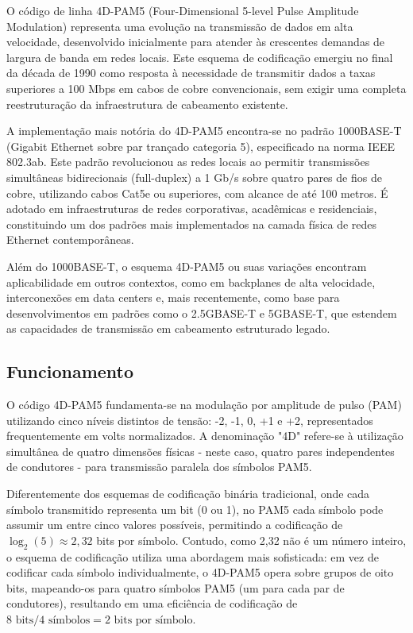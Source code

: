 \documentclass[conference]{IEEEtran}
\begin{document}
O código de linha 4D-PAM5 (Four-Dimensional 5-level Pulse Amplitude Modulation) representa uma evolução na transmissão de dados em alta velocidade, desenvolvido inicialmente para atender às crescentes demandas de largura de banda em redes locais. Este esquema de codificação emergiu no final da década de 1990 como resposta à necessidade de transmitir dados a taxas superiores a 100 Mbps em cabos de cobre convencionais, sem exigir uma completa reestruturação da infraestrutura de cabeamento existente.

A implementação mais notória do 4D-PAM5 encontra-se no padrão 1000BASE-T (Gigabit Ethernet sobre par trançado categoria 5), especificado na norma IEEE 802.3ab. Este padrão revolucionou as redes locais ao permitir transmissões simultâneas bidirecionais (full-duplex) a 1 Gb/s sobre quatro pares de fios de cobre, utilizando cabos Cat5e ou superiores, com alcance de até 100 metros. É adotado em infraestruturas de redes corporativas, acadêmicas e residenciais, constituindo um dos padrões mais implementados na camada física de redes Ethernet contemporâneas.

Além do 1000BASE-T, o esquema 4D-PAM5 ou suas variações encontram aplicabilidade em outros contextos, como em backplanes de alta velocidade, interconexões em data centers e, mais recentemente, como base para desenvolvimentos em padrões como o 2.5GBASE-T e 5GBASE-T, que estendem as capacidades de transmissão em cabeamento estruturado legado.

\subsection{Funcionamento}

O código 4D-PAM5 fundamenta-se na modulação por amplitude de pulso (PAM) utilizando cinco níveis distintos de tensão: -2, -1, 0, +1 e +2, representados frequentemente em volts normalizados. A denominação "4D" refere-se à utilização simultânea de quatro dimensões físicas - neste caso, quatro pares independentes de condutores - para transmissão paralela dos símbolos PAM5.

Diferentemente dos esquemas de codificação binária tradicional, onde cada símbolo transmitido representa um bit (0 ou 1), no PAM5 cada símbolo pode assumir um entre cinco valores possíveis, permitindo a codificação de $\log_2(5) \approx 2{,}32$ bits por símbolo. Contudo, como 2,32 não é um número inteiro, o esquema de codificação utiliza uma abordagem mais sofisticada: em vez de codificar cada símbolo individualmente, o 4D-PAM5 opera sobre grupos de oito bits, mapeando-os para quatro símbolos PAM5 (um para cada par de condutores), resultando em uma eficiência de codificação de $8 \text{ bits} / 4 \text{ símbolos} = 2 \text{ bits por símbolo}$.
\end{document}
